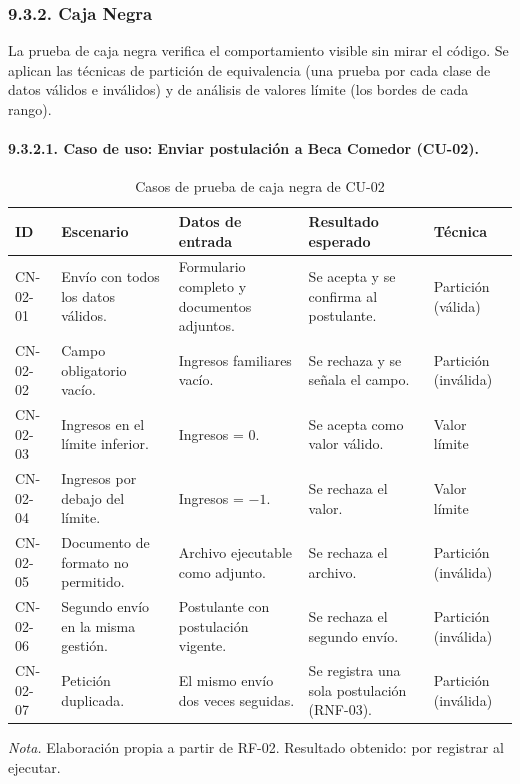 \subsubsection{9.3.2. Caja Negra}

La prueba de caja negra verifica el comportamiento visible sin mirar el código. Se aplican las técnicas de partición de equivalencia (una prueba por cada clase de datos válidos e inválidos) y de análisis de valores límite (los bordes de cada rango).

\paragraph{9.3.2.1. Caso de uso: Enviar postulación a Beca Comedor (CU-02).}

\begin{table}[H]
\centering
\caption{Casos de prueba de caja negra de CU-02}
\label{tab:cn_cu02}
\small
\begin{tabular}{@{}p{1.1cm}p{3.7cm}p{4.0cm}p{3.1cm}p{1.8cm}@{}}
\toprule
\textbf{ID} & \textbf{Escenario} & \textbf{Datos de entrada} & \textbf{Resultado esperado} & \textbf{Técnica} \\
\midrule
CN-02-01 & Envío con todos los datos válidos. & Formulario completo y documentos adjuntos. & Se acepta y se confirma al postulante. & Partición (válida) \\
CN-02-02 & Campo obligatorio vacío. & Ingresos familiares vacío. & Se rechaza y se señala el campo. & Partición (inválida) \\
CN-02-03 & Ingresos en el límite inferior. & Ingresos = 0. & Se acepta como valor válido. & Valor límite \\
CN-02-04 & Ingresos por debajo del límite. & Ingresos = $-1$. & Se rechaza el valor. & Valor límite \\
CN-02-05 & Documento de formato no permitido. & Archivo ejecutable como adjunto. & Se rechaza el archivo. & Partición (inválida) \\
CN-02-06 & Segundo envío en la misma gestión. & Postulante con postulación vigente. & Se rechaza el segundo envío. & Partición (inválida) \\
CN-02-07 & Petición duplicada. & El mismo envío dos veces seguidas. & Se registra una sola postulación (RNF-03). & Partición (inválida) \\
\bottomrule
\end{tabular}

\vspace{2pt}
\footnotesize\textit{Nota.} Elaboración propia a partir de RF-02. Resultado obtenido: por registrar al ejecutar.
\end{table}

